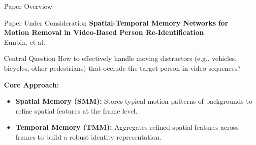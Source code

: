 \begin{frame}{Paper Overview}

    \begin{block}{Paper Under Consideration}
        \textbf{Spatial-Temporal Memory Networks for Motion Removal in Video-Based Person Re-Identification}\\
        Eunbin, et al.
    \end{block}

    \smallskip
    \begin{alertblock}{Central Question}
        How to effectively handle moving distractors (e.g., vehicles, bicycles, other pedestrians) that occlude the target person in video sequences?
    \end{alertblock}

    \medskip
    \textbf{Core Approach:}
    \begin{itemize}\setlength\itemsep{2pt}
        \item \textbf{Spatial Memory (SMM):} Stores typical motion patterns of backgrounds to refine spatial features at the frame level.
        \item \textbf{Temporal Memory (TMM):} Aggregates refined spatial features across frames to build a robust identity representation.
    \end{itemize}

\end{frame}

